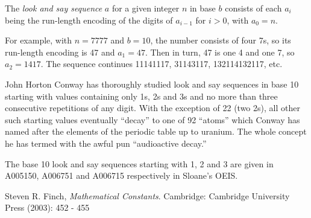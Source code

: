 \documentclass[12pt]{article}
\begin{document}
The {\em look and say sequence} $a$ for a given integer $n$ in base $b$ consists of each $a_i$ being the run-length encoding of the digits of $a_{i - 1}$ for $i > 0$, with $a_0 = n$.

For example, with $n = 7777$ and $b = 10$, the number consists of four 7s, so its run-length encoding is 47 and $a_1 = 47$. Then in turn, 47 is one 4 and one 7, so $a_2 = 1417$. The sequence continues 11141117, 31143117, 132114132117, etc.

John Horton Conway has thoroughly studied look and say sequences in base 10 starting with values containing only 1s, 2s and 3s and no more than three consecutive repetitions of any digit. With the exception of 22 (two 2s), all other such starting values eventually ``decay'' to one of 92 ``atoms'' which Conway has named after the elements of the periodic table up to uranium. The whole concept he has termed with the awful pun ``audioactive decay.''

The base 10 look and say sequences starting with 1, 2 and 3 are given in A005150, A006751 and A006715 respectively in Sloane's OEIS.

\begin{thebibliography}{1}
 Steven R. Finch, {\it Mathematical Constants}. Cambridge: Cambridge University Press (2003): 452 - 455
\end{thebibliography}
\end{document}
